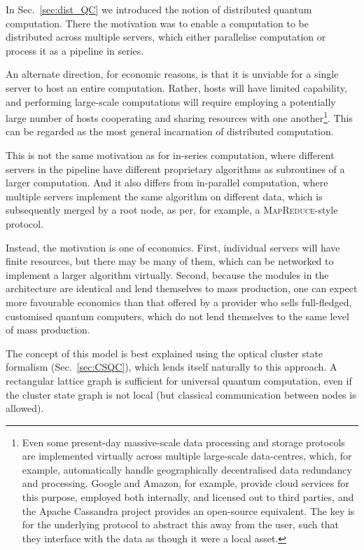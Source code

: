 In Sec.~\ref{sec:dist_QC} we introduced the notion of distributed quantum computation. There the motivation was to enable a computation to be distributed across multiple servers, which either parallelise computation or process it as a pipeline in series.

An alternate direction, for economic reasons, is that it is unviable for a single server to host an entire computation. Rather, hosts will have limited capability, and performing large-scale computations will require employing a potentially large number of hosts cooperating and sharing resources with one another\footnote{Even some present-day massive-scale data processing and storage protocols are implemented virtually across multiple large-scale data-centres, which, for example, automatically handle geographically decentralised data redundancy and processing. Google and Amazon, for example, provide cloud services for this purpose, employed both internally, and licensed out to third parties, and the Apache Cassandra project provides an open-source equivalent. The key is for the underlying protocol to abstract this away from the user, such that they interface with the data as though it were a local asset.}. This can be regarded as the most general incarnation of distributed computation.

This is not the same motivation as for in-series computation, where different servers in the pipeline have different proprietary algorithms as subroutines of a larger computation. And it also differs from in-parallel computation, where multiple servers implement the same algorithm on different data, which is subsequently merged by a root node, as per, for example, a \textsc{MapReduce}-style protocol.

Instead, the motivation is one of economics. First, individual servers will have finite resources, but there may be many of them, which can be networked to implement a larger algorithm virtually. Second, because the modules in the architecture are identical and lend themselves to mass production, one can expect more favourable economics than that offered by a provider who sells full-fledged, customised quantum computers, which do not lend themselves to the same level of mass production.

The concept of this model is best explained using the optical cluster state formalism (Sec.~\ref{sec:CSQC}), which lends itself naturally to this approach. A rectangular lattice graph is sufficient for universal quantum computation, even if the cluster state graph is not local (but classical communication between nodes is allowed).

